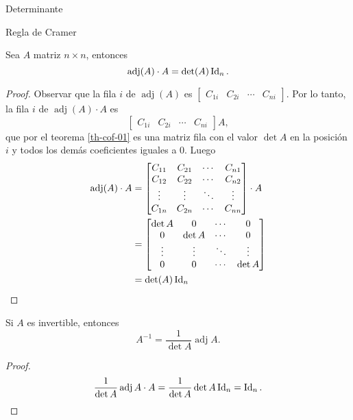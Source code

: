 \begin{chapter}{Determinante}
\begin{section}{Regla de Cramer}
        \begin{teorema} Sea $A$ matriz $n \times n$,  entonces
            \begin{equation*}
            \operatorname{adj}(A)\cdot A = \det(A)\operatorname{Id}_n.
            \end{equation*}
        \end{teorema}
        \begin{proof}
            Observar que la fila $i$ de $\operatorname{adj}(A)$ es $\begin{bmatrix} C_{1i} & C_{2i} & \cdots & C_{ni}\end{bmatrix}$. Por lo tanto, la fila $i$ de $\operatorname{adj}(A)\cdot A$ es
            $$
            \begin{bmatrix} C_{1i} & C_{2i} & \cdots & C_{ni}\end{bmatrix} A,
            $$ 
            que por el teorema \ref{th-cof-01} es una matriz fila con el valor $\det A$ en la posición $i$ y todos los demás coeficientes iguales a 0. Luego
            \begin{align*}
                \operatorname{adj}(A)\cdot A &= 
                \begin{bmatrix} C_{11} & C_{21} & \cdots & C_{n1}\\
                C_{12} & C_{22} & \cdots & C_{n2} \\
                \vdots & \vdots & \ddots & \vdots \\
                C_{1n} & C_{2n} & \cdots & C_{nn}\end{bmatrix}\cdot  A\\
                & = 
                \begin{bmatrix}\det A & 0 & \cdots & 0\\
                0 & \det A & \cdots & 0 \\
                \vdots & \vdots & \ddots & \vdots \\
                0 & 0 & \cdots & \det A\end{bmatrix} \\
                &= \det(A) \operatorname{Id}_n
            \end{align*}
        \end{proof}
        
        \begin{corolario}\label{cor-inv-x-det}
            Si $A$  es invertible,  entonces 
            \begin{equation*}
            A^{-1} = \frac{1}{\det A} \operatorname{adj}A.
            \end{equation*}
        \end{corolario}
        \begin{proof}
            \begin{equation*}
            \frac{1}{\det A} \operatorname{adj}A\cdot A = \frac{1}{\det A}\det A \operatorname{Id}_n = \operatorname{Id}_n.
            \end{equation*}
        \end{proof}
        

\end{section}
\end{chapter}
